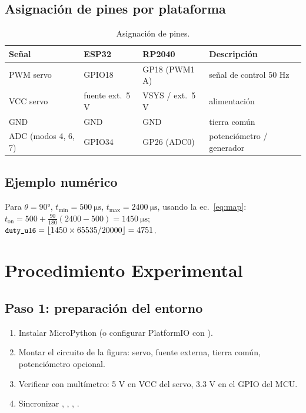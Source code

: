 \documentclass[11pt]{article}
\begin{document}
\subsection{Asignación de pines por plataforma}
\begin{table}[H]\centering
\caption{Asignación de pines.}
\begin{tabular}{llll}
\toprule
Señal & ESP32 & RP2040 & Descripción \\
\midrule
PWM servo & GPIO18 & GP18 (PWM1 A) & señal de control 50 Hz \\
VCC servo & fuente ext.\ 5 V & VSYS / ext.\ 5 V & alimentación \\
GND & GND & GND & tierra común \\
ADC (modos 4, 6, 7) & GPIO34 & GP26 (ADC0) & potenciómetro / generador \\
\bottomrule
\end{tabular}
\end{table}

\subsection{Ejemplo numérico}
Para $\theta=90\si{\degree}$, $t_\text{min}=\SI{500}{\micro\second}$,
$t_\text{max}=\SI{2400}{\micro\second}$, usando la ec.~\eqref{eq:map}:
$t_\text{on} = 500 + \frac{90}{180}(2400-500) = \SI{1450}{\micro\second}$;
$\texttt{\small duty\_u16} = \lfloor 1450\times 65535/20000\rfloor = 4751$.

\section{Procedimiento Experimental}

\subsection{Paso 1: preparación del entorno}
\begin{enumerate}
  \item Instalar MicroPython (o configurar PlatformIO con ).
  \item Montar el circuito de la figura: servo, fuente externa, tierra común,
        potenciómetro opcional.
  \item Verificar con multímetro: 5 V en VCC del servo, 3.3 V en el GPIO del MCU.
  \item Sincronizar , , , .
\end{enumerate}
\end{document}
